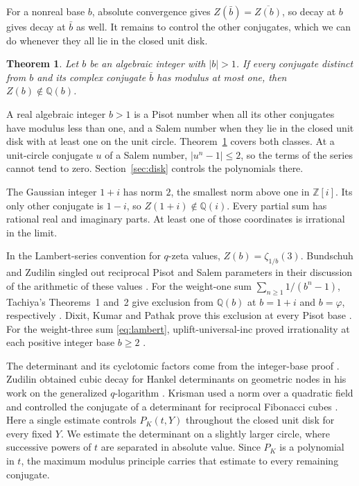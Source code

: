 \documentclass[11pt,letterpaper]{article}
\newtheorem{theorem}{Theorem}[section]
\numberwithin{equation}{section}
\newcommand{\Q}{\mathbb Q}
\newcommand{\Z}{\mathbb Z}
\begin{document}
For a nonreal base \(b\), absolute convergence gives
\(Z(\bar b)=\overline{Z(b)}\), so decay at \(b\) gives decay at
\(\bar b\) as well. It remains to control the other conjugates, which
we can do whenever they all lie in the closed unit disk.

\begin{theorem}\label{thm:main}
Let \(b\) be an algebraic integer with \(|b|>1\). If every conjugate
distinct from \(b\) and its complex conjugate \(\bar b\) has modulus
at most one, then \(Z(b)\notin\Q(b)\).
\end{theorem}

A real algebraic integer \(b>1\) is a Pisot number when all its
other conjugates have modulus less than one, and a Salem number when
they lie in the closed unit disk with at least one on the unit circle.
Theorem~\ref{thm:main} covers both classes. At a unit-circle conjugate
\(u\) of a Salem number, \(|u^n-1|\le2\), so the terms of the series
cannot tend to zero. Section~\ref{sec:disk} controls the polynomials there.

The Gaussian integer \(1+i\) has norm \(2\), the smallest norm above
one in \(\Z[i]\). Its only other conjugate is \(1-i\), so
\(Z(1+i)\notin\Q(i)\). Every partial sum has rational real and imaginary
parts. At least one of those coordinates is irrational in the limit.

In the Lambert-series convention for \(q\)-zeta values,
\(Z(b)=\zeta_{1/b}(3)\). Bundschuh and Zudilin singled out reciprocal
Pisot and Salem parameters in their discussion of the arithmetic of
these values \cite[\S6, after (41)]{BZ}.
For the weight-one sum \(\sum_{n\ge1}1/(b^n-1)\), Tachiya's
Theorems~1 and~2 give exclusion from \(\Q(b)\) at \(b=1+i\) and
\(b=\varphi\), respectively \cite[p.~232]{Tachiya}. Dixit, Kumar and
Pathak prove this exclusion at every Pisot base \cite[Corollary~1.2]{DKP}.
For the weight-three sum \eqref{eq:lambert}, uplift-universal-inc
proved irrationality at each positive integer base \(b\ge2\)
\cite[Theorem~1.1]{Uplift}.

The determinant and its cyclotomic factors come from the integer-base
proof \cite[\S\S1--5 and Appendix~A]{Uplift}. Zudilin obtained cubic
decay for Hankel determinants on geometric nodes in his work on the
generalized \(q\)-logarithm \cite[\S4, (8)]{Zudilin}.
Krisman used a norm over a quadratic field and controlled the conjugate
of a determinant for reciprocal Fibonacci cubes \cite[\S5]{Krisman}.
Here a single estimate controls \(P_K(t,Y)\) throughout the closed
unit disk for every fixed \(Y\). We estimate the determinant on a
slightly larger circle, where successive powers of \(t\) are
separated in absolute value. Since \(P_K\) is a polynomial in \(t\), the maximum
modulus principle carries that estimate to every remaining conjugate.
\end{document}

